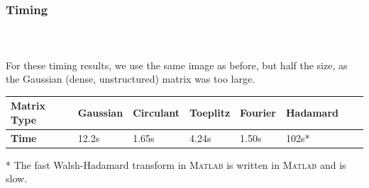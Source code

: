 \begin{frame}[t]
\frametitle{Timing}
\framesubtitle{~~}  %

For these timing results, we use the same image as before, but half the size, as the 
Gaussian (dense, unstructured) matrix was too large.


\begin{table}[h]
\begin{tabular}{l|lllllll}
	\textbf{Matrix Type} & Gaussian & Circulant & Toeplitz & Fourier & Hadamard \\ \hline
	\textbf{Time}        & 12.2s    & 1.65s     & 4.24s    & 1.50s   & 102s*    \\
\end{tabular}
\end{table}
* The fast Walsh-Hadamard transform in \textsc{Matlab} is written in \textsc{Matlab} and is slow.


\end{frame}
